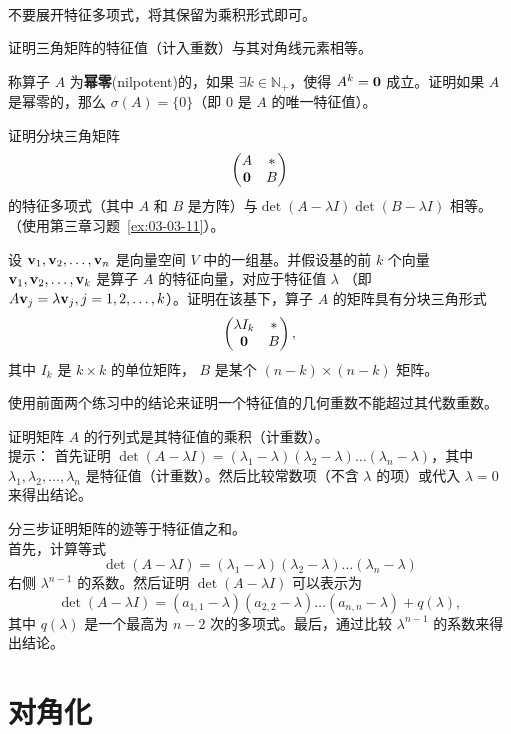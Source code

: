 \begin{problemset}
\\
不要展开特征多项式，将其保留为乘积形式即可。
\item \label{ex:04-01-05} 证明三角矩阵的特征值（计入重数）与其对角线元素相等。
\item \label{ex:04-01-06} 称算子 $A$ 为\textbf{幂零}(nilpotent)的，如果 $\exists k \in \mathbb{N}_+$，使得  $A^k = \mathbf{0}$ 成立。证明如果 $A$ 是幂零的，那么 $\sigma(A) = \{0\}$（即 $0$ 是 $A$ 的唯一特征值）。
\item \label{ex:04-01-07} 证明分块三角矩阵 $$\begin{pmatrix} A & * \\ \mathbf{0} & B \end{pmatrix}$$
的特征多项式（其中 $A$ 和 $B$ 是方阵）与$\det(A - \lambda I) \det(B - \lambda I)$ 相等。（使用第三章习题~\ref{ex:03-03-11}）。
\item \label{ex:04-01-08} 设 $\mathbf{v}_1, \mathbf{v}_2, \dots, \mathbf{v}_n$ 是向量空间 $V$ 中的一组基。并假设基的前 $k$ 个向量 $\mathbf{v}_1, \mathbf{v}_2, \dots, \mathbf{v}_k$ 是算子 $A$ 的特征向量，对应于特征值 $\lambda$ （即 $A\mathbf{v}_j = \lambda \mathbf{v}_j, j = 1, 2, \dots, k$）。证明在该基下，算子 $A$ 的矩阵具有分块三角形式
$$\begin{pmatrix} \lambda I_k & * \\ \mathbf{0} & B \end{pmatrix},$$
其中 $I_k$ 是 $k \times k$ 的单位矩阵， $B$ 是某个 $(n-k) \times (n-k)$ 矩阵。
\item \label{ex:04-01-09} 使用前面两个练习中的结论来证明一个特征值的几何重数不能超过其代数重数。
\item \label{ex:04-01-10} 证明矩阵 $A$ 的行列式是其特征值的乘积（计重数）。
\\
{\heiti 提示}： 首先证明 $\det(A - \lambda I) = (\lambda_1 - \lambda)(\lambda_2 - \lambda)\dots(\lambda_n - \lambda)$，其中 $\lambda_1, \lambda_2, \dots, \lambda_n$ 是特征值（计重数）。然后比较常数项（不含 $\lambda$ 的项）或代入 $\lambda = 0$ 来得出结论。
\item \label{ex:04-01-11} 分三步证明矩阵的迹等于特征值之和。\\
首先，计算等式 $$\det(A - \lambda I) = (\lambda_1 - \lambda)(\lambda_2 - \lambda)\dots(\lambda_n - \lambda)$$
右侧 $\lambda^{n-1}$ 的系数。然后证明 $\det(A - \lambda I)$ 可以表示为
$$\det(A - \lambda I) = (a_{1,1} - \lambda)(a_{2,2} - \lambda)\dots(a_{n,n} - \lambda) + q(\lambda),$$
其中 $q(\lambda)$ 是一个最高为 $n-2$ 次的多项式。最后，通过比较 $\lambda^{n-1}$ 的系数来得出结论。
\end{problemset}


\section{对角化}\label{sec:04-02}

